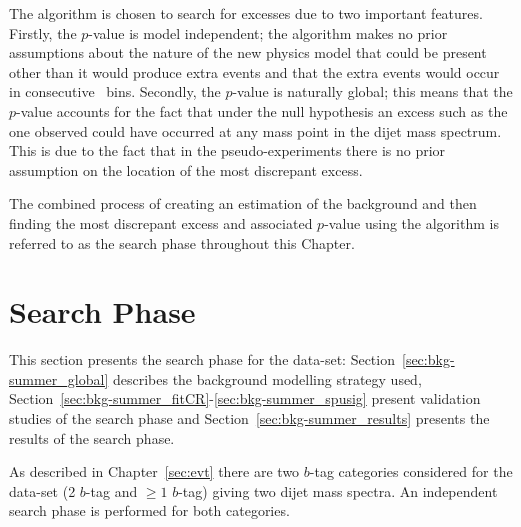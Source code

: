 The \bh{} algorithm is chosen to search for excesses due to two important features.
Firstly, the \bh{} \mbox{$p$-value} is model independent;
the algorithm makes no prior assumptions about the nature of the new physics model that could be present
other than it would produce extra events and that the extra events would occur in consecutive~\mjj{} bins.
Secondly, the \bh{} \mbox{$p$-value} is naturally global;
this means that the \mbox{$p$-value} accounts for the fact that under the null hypothesis an excess such as the one observed could have occurred at any mass point in the dijet mass spectrum.
This is due to the fact that in the pseudo-experiments there is no prior assumption on the location of the most discrepant excess.


The combined process of creating an estimation of the background and then
finding the most discrepant excess and associated $p$-value using the \bh{} algorithm
is referred to as the search phase throughout this Chapter.

\clearpage

\section{\summer{} Search Phase}
\label{sec:bkg-summer}

This section presents the search phase for the \summer{} data-set:
Section~\ref{sec:bkg-summer_global} describes the background modelling strategy used,
Section~\ref{sec:bkg-summer_fitCR}-\ref{sec:bkg-summer_spusig}
present validation studies of the search phase
and Section~\ref{sec:bkg-summer_results} presents the results of the search phase.

As described in Chapter~\ref{sec:evt}
there are two $b$-tag categories considered for the \summer{} data-set 
(2 $b$-tag and $\geq1$ $b$-tag) giving two dijet mass spectra.
An independent search phase is performed for both categories.

